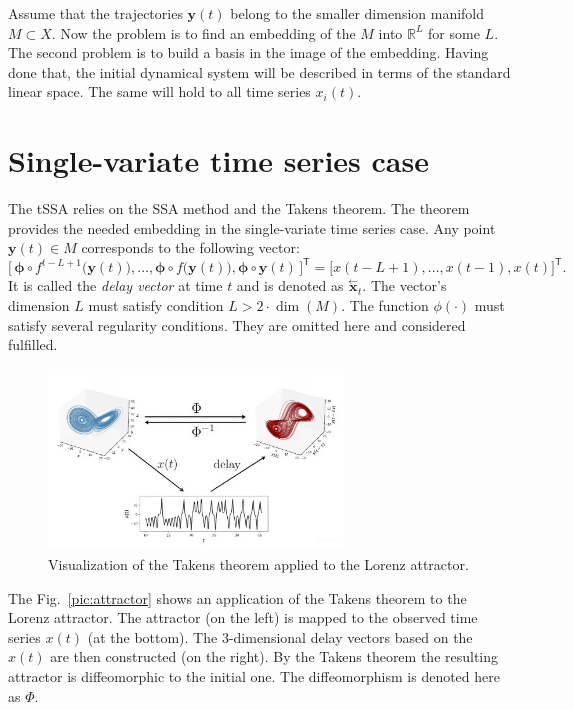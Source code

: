 \documentclass[referee, pdflatex, sn-mathphys-num]{sn-jnl}
\theoremstyle{definition}
\theoremstyle{plain}
\newcommand{\delayV}[1]{\overset{\leftarrow}{\mathbf{x}}_{#1}}
\begin{document}
	Assume that the trajectories $ \mathbf{y}(t) $ belong to the smaller dimension manifold $ M \subset X $. Now the problem is to find an embedding of the $ M $ into $ \mathbb{R}^{L} $ for some $ L $. The second problem is to build a basis in the image of the embedding. Having done that, the initial dynamical system will be described in terms of the standard linear space. The same will hold to all time series $ x_i(t) $.

	\section{Single-variate time series case}\label{sec:one_series}
	
	The tSSA relies on the SSA method and the Takens theorem. The theorem provides the needed embedding in the single-variate time series case. Any point $ \mathbf{y}(t) \in M $ corresponds to the following vector: \begin{equation*}
		\bigl[ \, \boldsymbol{\phi} \circ f^{t - L + 1} \bigl( \mathbf{y}(t) \bigr), \ldots , \boldsymbol{\phi} \circ f \bigl( \mathbf{y}(t) \bigr), \boldsymbol{\phi} \circ \mathbf{y}(t) \, \bigr]^{\mathsf{T}} = \bigl[ x(t - L + 1), \ldots , x(t-1), x(t) \bigr]^{\mathsf{T}}.
	\end{equation*}	It is called the \emph{delay vector} at time $ t $ and is denoted as $ \delayV{t} $. The vector's dimension $ L $ must satisfy condition $ L > 2 \cdot \dim(M) $. The function $ \phi(\cdot) $ must satisfy several regularity conditions. They are omitted here and considered fulfilled.
	
	\begin{figure}[!htbp]
		\centering
		\includegraphics[width=0.7\textwidth, keepaspectratio]{takens_theorem.jpg}
		\caption{Visualization of the Takens theorem applied to the Lorenz attractor.}\label{pic:takens_theorem}
	\end{figure}
	
	The Fig.~\ref{pic:attractor} shows an application of the Takens theorem to the Lorenz attractor. The attractor (on the left) is mapped to the observed time series $x(t)$ (at the bottom). The 3-dimensional delay vectors based on the $x(t)$ are then constructed (on the right). By the Takens theorem the resulting attractor is diffeomorphic to the initial one. The diffeomorphism is denoted here as $\Phi$.
	
\end{document}
